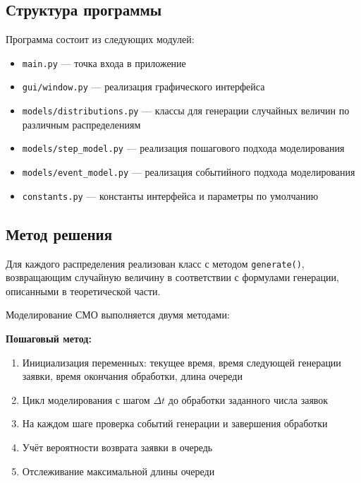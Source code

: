 \subsection{Структура программы}

Программа состоит из следующих модулей:

\begin{itemize}
    \item \texttt{main.py} — точка входа в приложение
    \item \texttt{gui/window.py} — реализация графического интерфейса
    \item \texttt{models/distributions.py} — классы для генерации случайных величин по различным распределениям
    \item \texttt{models/step\_model.py} — реализация пошагового подхода моделирования
    \item \texttt{models/event\_model.py} — реализация событийного подхода моделирования
    \item \texttt{constants.py} — константы интерфейса и параметры по умолчанию
\end{itemize}

\subsection{Метод решения}

Для каждого распределения реализован класс с методом \texttt{generate()}, возвращающим случайную величину в соответствии с формулами генерации, описанными в теоретической части.

Моделирование СМО выполняется двумя методами:

\textbf{Пошаговый метод:}
\begin{enumerate}
    \item Инициализация переменных: текущее время, время следующей генерации заявки, время окончания обработки, длина очереди
    \item Цикл моделирования с шагом $\Delta t$ до обработки заданного числа заявок
    \item На каждом шаге проверка событий генерации и завершения обработки
    \item Учёт вероятности возврата заявки в очередь
    \item Отслеживание максимальной длины очереди
\end{enumerate}

